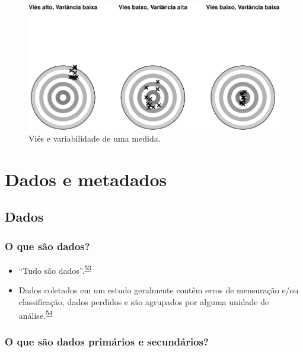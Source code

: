 \documentclass[
  a4paper,
]{book}
\begin{document}
\begin{figure}

{\centering \includegraphics{Ciencia-com-R_files/figure-latex/vies-variabilidade-1} 

}

\caption{Viés e variabilidade de uma medida.}\label{fig:vies-variabilidade}
\end{figure}

\hypertarget{dados-metadados}{%
\chapter{\texorpdfstring{\textbf{Dados e metadados}}{Dados e metadados}}\label{dados-metadados}}

\hypertarget{dados}{%
\section{Dados}\label{dados}}

\hypertarget{o-que-suxe3o-dados}{%
\subsection{O que são dados?}\label{o-que-suxe3o-dados}}

\begin{itemize}
\item
  ``Tudo são dados''.\textsuperscript{\protect\hyperlink{ref-Olson2021}{53}}
\item
  Dados coletados em um estudo geralmente contêm erros de mensuração e/ou classificação, dados perdidos e são agrupados por alguma unidade de análise.\textsuperscript{\protect\hyperlink{ref-van2022a}{54}}
\end{itemize}

\hypertarget{o-que-suxe3o-dados-primuxe1rios-e-secunduxe1rios}{%
\subsection{O que são dados primários e secundários?}\label{o-que-suxe3o-dados-primuxe1rios-e-secunduxe1rios}}
\end{document}
